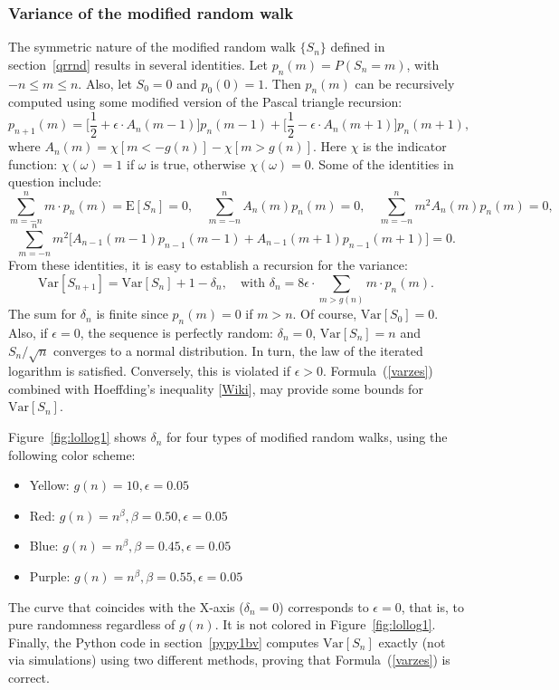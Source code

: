 \documentclass[oneside,10pt]{book}
\begin{document}
\subsubsection{Variance of the modified random walk}

The symmetric nature of the modified random walk $\{S_n\}$ defined in section~\ref{qrrnd} results in several
identities.  Let $p_n(m)=P(S_n=m)$, with $-n\leq m \leq n$. Also, let $S_0=0$ and $p_0(0)=1$. Then $p_n(m)$ can be recursively computed using some modified version of the Pascal triangle recursion:
\begin{equation}
p_{n+1}(m)=\Big[\frac{1}{2}+\epsilon \cdot A_n(m-1)\Big]p_n(m-1)+\Big[\frac{1}{2}-\epsilon\cdot A_n(m+1)\Big]p_n(m+1),\label{zxzdc}
\end{equation}
where $A_n(m)=\chi[m<-g(n)]-\chi[m>g(n)]$. Here $\chi$ is the indicator function: $\chi(\omega)=1$ if $\omega$ is true, otherwise $\chi(\omega)=0$.
Some of the identities in question include:
$$
\sum_{m=-n}^n m \cdot p_n(m)=\text{E}[S_n]=0,\quad
\sum_{m=-n}^n A_n(m)p_n(m)=0,\quad
\sum_{m=-n}^n m^2 A_n(m)p_n(m)=0,
$$
$$
\sum_{m=-n}^n m^2 \Big[A_{n-1}(m-1)p_{n-1}(m-1)+A_{n-1}(m+1)p_{n-1}(m+1)\Big]=0.
$$
From these identities, it is easy to establish a recursion for the variance:
\begin{equation}
\text{Var}[S_{n+1}]=\text{Var}[S_n]+1-\delta_n, \quad \text{with }\delta_n=8\epsilon\cdot \sum_{m>g(n)} m \cdot p_n(m).\label{varzes}
\end{equation}
The sum for $\delta_n$ is finite since $p_n(m)=0$ if $m>n$.   Of course, 
$\text{Var}[S_0]=0$. Also, if $\epsilon=0$, the sequence is perfectly random: $\delta_n=0$, $\text{Var}[S_n]=n$ and
 $S_n/\sqrt{n}$ converges to a normal distribution. In turn, the law of the iterated logarithm is satisfied. Conversely, 
 this is violated if $\epsilon>0$. Formula~(\ref{varzes}) 
 combined with \textcolor{index}{Hoeffding's inequality} [\href{https://en.wikipedia.org/wiki/Hoeffding\%27s_inequality}{Wiki}], may
 provide some bounds for $\text{Var}[S_n]$. 

\noindent Figure~\ref{fig:lollog1} shows $\delta_n$ for four types of modified random walks, using the following color scheme:
\begin{itemize}
\item Yellow: $g(n)=10,\epsilon=0.05$
\item Red: $g(n)=n^\beta,\beta=0.50, \epsilon=0.05$
\item Blue: $g(n)=n^\beta,\beta=0.45, \epsilon=0.05$
\item Purple: $g(n)=n^\beta,\beta=0.55, \epsilon=0.05$
\end{itemize}
The curve that coincides with the X-axis ($\delta_n = 0$) corresponds to $\epsilon=0$, that is, to  pure randomness regardless of $g(n)$. It is not
 colored in Figure~\ref{fig:lollog1}. Finally, the Python code in section~\ref{pypy1bv} computes $\text{Var}[S_n]$ exactly (not via simulations) using two different methods, proving that
 Formula~(\ref{varzes}) is correct. 
\end{document}
